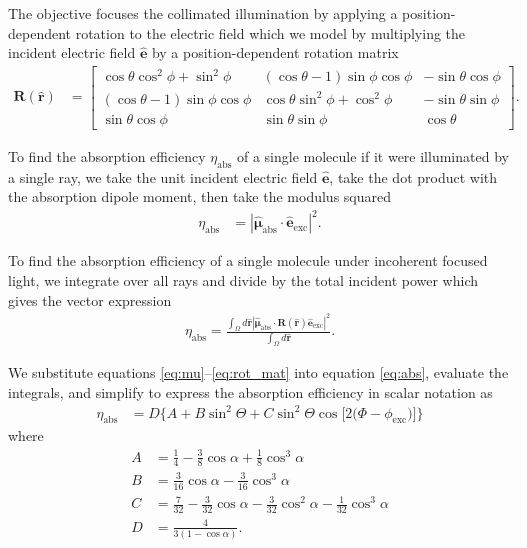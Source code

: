 \documentclass[10pt]{article}
\providecommand{\mb}[1]{\mathbf{#1}}
\providecommand{\mh}[1]{\mathbf{\hat{#1}}}
\providecommand{\bs}[1]{\boldsymbol{#1}}
\begin{document}
  The objective focuses the collimated illumination by applying a position-dependent
  rotation to the electric field which we model by multiplying the incident electric
  field $\hat{\mb{e}}$ by a position-dependent rotation matrix
  \begin{align}
  \mb{R}(\mh{r}) &= \begin{bmatrix} \cos\theta\cos^2\phi + \sin^2\phi & (\cos\theta -1)\sin\phi\cos\phi & -\sin\theta\cos\phi\\ (\cos\theta - 1)\sin\phi\cos\phi & \cos\theta\sin^2\phi + \cos^2\phi & -\sin\theta\sin\phi \\ \sin\theta\cos\phi& \sin\theta\sin\phi & \cos\theta \end{bmatrix} \label{eq:rot_mat}.
  \end{align}

  To find the absorption efficiency $\eta_{\text{abs}}$ of a single molecule if
  it were illuminated by a single ray, we take the unit incident electric field
  $\hat{\mb{e}}$, take the dot product with the absorption dipole moment, then
  take the modulus squared
    \begin{align}
      \eta_{\text{abs}} &= |\hat{\bs{\mu}}_{\text{abs}}\cdot\mh{e}_{\text{exc}}|^2. \label{eq:singleray}
    \end{align}

    To find the absorption efficiency of a single molecule under incoherent
    focused light, we integrate over all rays and divide by the total incident
    power which gives the vector expression
\begin{align}
  \eta_{\text{abs}} = \frac{\int_{\Omega}d\mh{r}|\hat{\bs{\mu}}_{\text{abs}}\cdot\mb{R}(\mh{r})\mh{e}_{\text{exc}}|^2}{\int_{\Omega}d\mh{r}}\label{eq:abs}. 
\end{align}

We substitute equations \ref{eq:mu}--\ref{eq:rot_mat} into equation
\ref{eq:abs}, evaluate the integrals, and simplify to express the absorption
efficiency in scalar notation as
\begin{align}
  \eta_{\text{abs}} &= D\{A + B\sin^{2}{\Theta} + C\sin^{2}{\Theta} \cos{[2 (\Phi - \phi_{\text{exc}}})]\}\label{eq:scalarabs}
\end{align}
where
\begin{subequations}
\begin{align}
  A &= \frac{1}{4} - \frac{3}{8} \cos{\alpha } + \frac{1}{8} \cos^{3}{\alpha }\\
  B &= \frac{3}{16} \cos{\alpha } - \frac{3}{16} \cos^{3}{\alpha }\\
  C &= \frac{7}{32} - \frac{3}{32} \cos{\alpha } - \frac{3}{32} \cos^{2}{\alpha } - \frac{1}{32} \cos^{3}{\alpha}\\
  D &= \frac{4}{3(1 - \cos\alpha)}.
\end{align}\label{eq:coefficients}%
\end{subequations}
\end{document}
